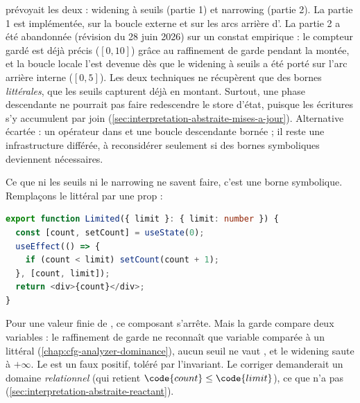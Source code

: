 \begin{decision}
   prévoyait les deux : widening à seuils (partie 1) et narrowing
  (partie 2). La partie 1 est implémentée, sur la boucle externe et sur les
  arcs arrière d'. La partie 2 a été abandonnée
  (révision du 28 juin 2026) sur un constat empirique : le compteur gardé
  est déjà précis ($[0,10]$) grâce au raffinement de garde pendant la montée,
  et la boucle locale l'est devenue dès que le widening à seuils a été porté
  sur l'arc arrière interne ($[0,5]$). Les deux techniques ne récupèrent que
  des bornes \emph{littérales}, que les seuils capturent déjà en montant.
  Surtout, une phase descendante ne pourrait pas faire redescendre le store
  d'état, puisque les écritures s'y accumulent par join
  (\cref{sec:interpretation-abstraite-mises-a-jour}). Alternative écartée : un
  opérateur  dans  et une boucle
  descendante bornée ; il reste une infrastructure différée, à reconsidérer
  seulement si des bornes symboliques deviennent nécessaires.
\end{decision}

Ce que ni les seuils ni le narrowing ne savent faire, c'est une borne
symbolique. Remplaçons le littéral par une prop :

\begin{lstlisting}[language=TypeScript,caption={Une garde à borne symbolique (\file{/tmp/ch03/limit.tsx}, élagué de sa ligne d'import)},label={lst:interpretation-abstraite-limit}]
export function Limited({ limit }: { limit: number }) {
  const [count, setCount] = useState(0);
  useEffect(() => {
    if (count < limit) setCount(count + 1);
  }, [count, limit]);
  return <div>{count}</div>;
}
\end{lstlisting}


Pour une valeur finie de , ce composant s'arrête. Mais la garde
 compare deux variables : le raffinement de garde ne
reconnaît que \og variable comparée à un littéral\fg{}
(\cref{chap:cfg-analyzer-dominance}), aucun seuil ne vaut , et le
widening saute à $+\infty$. Le \Warning{} est un faux positif, toléré par
l'invariant. Le corriger demanderait un domaine \emph{relationnel} (qui
retient $ \le {}$), ce que \reactant{} n'a pas
(\cref{sec:interpretation-abstraite-reactant}).

